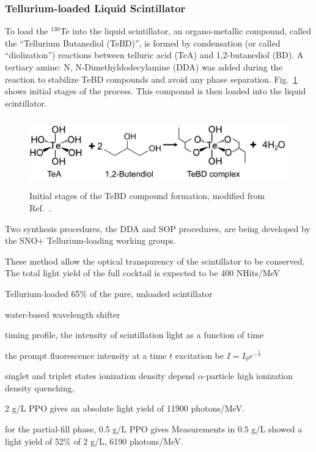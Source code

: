 \subsubsection{Tellurium-loaded Liquid Scintillator}\label{sect:TeLS_SNO+}

To load the $^{130}$Te into the liquid scintillator, an organo-metallic compound, called the ``Tellurium Butanediol (TeBD)'', is formed by 
condensation (or called ``diolization'') reactions between telluric acid (TeA) and 1,2-butanediol (BD)\cite{Paton:2019kgy}. A tertiary amine: N, N-Dimethyldodecylamine (DDA) was added during the reaction to stabilize TeBD compounds and avoid any phase separation\cite{teLoadingPaper}. Fig.~\ref{fig:paton_te} shows initial stages of the process. This compound is then loaded into the liquid scintillator.
\begin{figure}[!htb]
	\centering
	\includegraphics[height = 3cm]{TeBD_process.png}
	\caption{Initial stages of the TeBD compound formation, modified from Ref.~\cite{Paton:2019kgy}.}
	\label{fig:paton_te}
\end{figure}

Two synthesis procedures, the DDA and SOP procedures, are being developed by the SNO+ Tellurium-loading working groups\cite{biller2017new,teDDA,DDAvsSOP}.

These method allow the optical transparency of the scintillator to be conserved. 
The total light yield of the full cocktail is expected to be 400 NHits/MeV 

Tellurium-loaded 65\% of the pure, unloaded scintillator

water-based wavelength shifter

timing profile, the intensity of scintillation light as a function of time

the prompt fluorescence intensity at a time $t$ excitation be $I=I_0e^{-\frac{t}{\tau}}$

singlet and triplet states 
ionization density 
depend
$\alpha$-particle
high ionization density 
quenching, 


2 g/L PPO gives an absolute light yield of 11900 photons/MeV.


for the partial-fill phase, 0.5 g/L PPO gives Measurements in 0.5 g/L showed a light yield of 52\% of 2 g/L,  
6190 photons/MeV\cite{tanner0p5,joshW1}.

